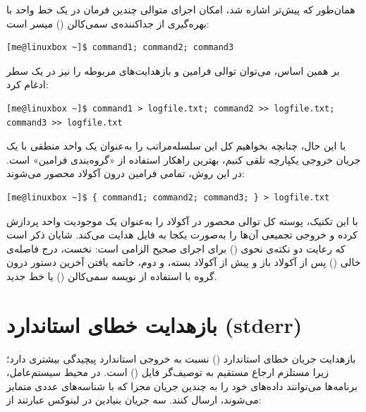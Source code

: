 همان‌طور که پیش‌تر اشاره شد، امکان اجرای متوالی چندین فرمان در یک خط واحد با بهره‌گیری از جداکننده‌ی سمی‌کالن (\cmd{;}) میسر است:

\begin{latin}
\begin{lstlisting}
[me@linuxbox ~]$ command1; command2; command3
\end{lstlisting}
\end{latin}

بر همین اساس، می‌توان توالی فرامین و بازهدایت‌های مربوطه را نیز در یک سطر ادغام کرد:

\begin{latin}
\begin{lstlisting}
[me@linuxbox ~]$ command1 > logfile.txt; command2 >> logfile.txt; command3 >> logfile.txt
\end{lstlisting}
\end{latin}

با این حال، چنانچه بخواهیم کل این سلسله‌مراتب را به‌عنوان یک واحد منطقی با یک جریان خروجی یکپارچه تلقی کنیم، بهترین راهکار استفاده از «گروه‌بندی فرامین» است. در این روش، تمامی فرامین درون آکولاد \cmd{\{ \}} محصور می‌شوند:

\begin{latin}
\begin{lstlisting}
[me@linuxbox ~]$ { command1; command2; command3; } > logfile.txt
\end{lstlisting}
\end{latin}

با این تکنیک، پوسته کل توالی محصور در آکولاد را به‌عنوان یک موجودیت واحد پردازش کرده و خروجی تجمیعی آن‌ها را به‌صورت یکجا به فایل  هدایت می‌کند. شایان ذکر است که رعایت دو نکته‌ی نحوی () برای اجرای صحیح الزامی است: نخست، درج فاصله‌ی خالی () پس از آکولاد باز و پیش از آکولاد بسته، و دوم، خاتمه یافتن آخرین دستور درون گروه با استفاده از نویسه سمی‌کالن (\cmd{;}) یا خط جدید.

\section{بازهدایت خطای استاندارد (stderr)}

بازهدایت جریان خطای استاندارد () نسبت به خروجی استاندارد پیچیدگی بیشتری دارد؛ زیرا مستلزم ارجاع مستقیم به توصیف‌گر فایل () است. در محیط سیستم‌عامل، برنامه‌ها می‌توانند داده‌های خود را به چندین جریان مجزا که با شناسه‌های عددی متمایز می‌شوند، ارسال کنند. سه جریان بنیادین در لینوکس عبارتند از:

